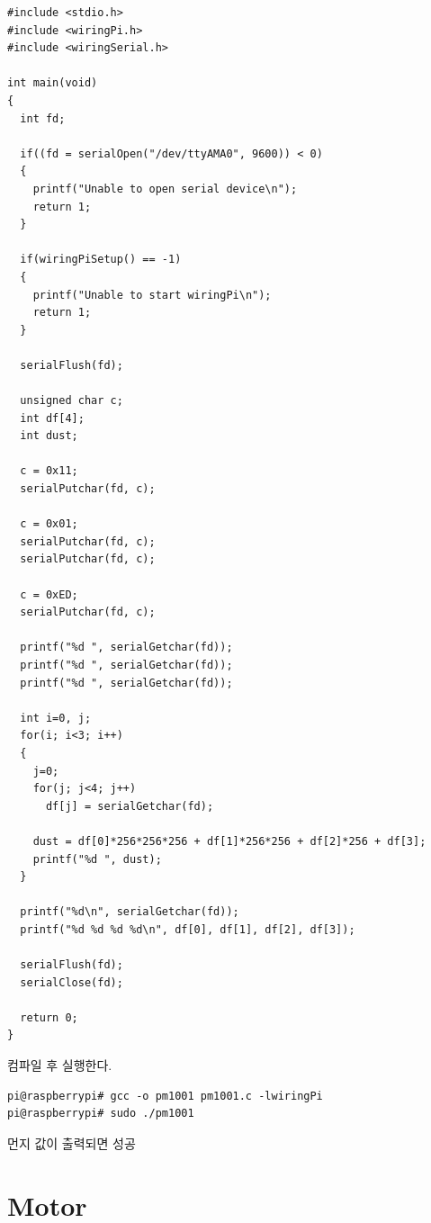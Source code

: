 \documentclass[11pt
  , a4paper
  , article
  , oneside
]{memoir}
\begin{document}
\begin{lstlisting}[style=termstylenumber, caption={pm1001.c}, label={list:pm1001TestCode}]
#include <stdio.h>
#include <wiringPi.h>
#include <wiringSerial.h>

int main(void)
{
  int fd;

  if((fd = serialOpen("/dev/ttyAMA0", 9600)) < 0)
  {
    printf("Unable to open serial device\n");
    return 1;
  }

  if(wiringPiSetup() == -1)
  {
    printf("Unable to start wiringPi\n");
    return 1;
  }

  serialFlush(fd);

  unsigned char c;
  int df[4];
  int dust;

  c = 0x11;
  serialPutchar(fd, c);

  c = 0x01;
  serialPutchar(fd, c);
  serialPutchar(fd, c);

  c = 0xED;
  serialPutchar(fd, c);

  printf("%d ", serialGetchar(fd));
  printf("%d ", serialGetchar(fd));
  printf("%d ", serialGetchar(fd));

  int i=0, j;
  for(i; i<3; i++)
  {
    j=0;
    for(j; j<4; j++)
      df[j] = serialGetchar(fd);

    dust = df[0]*256*256*256 + df[1]*256*256 + df[2]*256 + df[3];
    printf("%d ", dust);
  }

  printf("%d\n", serialGetchar(fd));
  printf("%d %d %d %d\n", df[0], df[1], df[2], df[3]);

  serialFlush(fd);
  serialClose(fd);

  return 0;
}
\end{lstlisting}
컴파일 후 실행한다.
\begin{lstlisting}[style=termstyle]
pi@raspberrypi# gcc -o pm1001 pm1001.c -lwiringPi
pi@raspberrypi# sudo ./pm1001
\end{lstlisting}
먼지 값이 출력되면 성공
\section{Motor}
\end{document}
